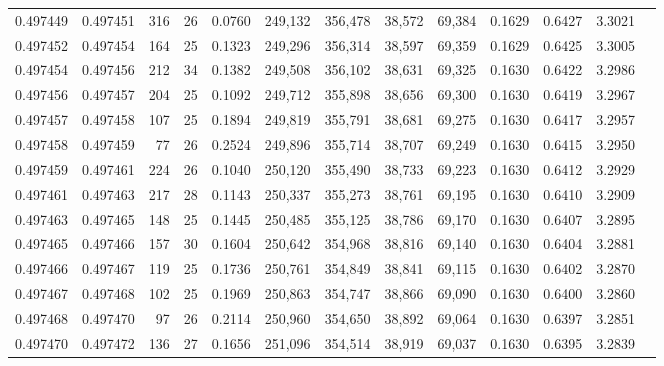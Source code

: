 \begin{tabular}{rrrrrrrrrrrrr}
0.497449 & 0.497451 & 316 &  26 &                                     0.0760 & 249,132 & 356,478 &  38,572 &  69,384 & 0.1629 & 0.6427 & 3.3021 \\
0.497452 & 0.497454 & 164 &  25 &                                     0.1323 & 249,296 & 356,314 &  38,597 &  69,359 & 0.1629 & 0.6425 & 3.3005 \\
0.497454 & 0.497456 & 212 &  34 &                                     0.1382 & 249,508 & 356,102 &  38,631 &  69,325 & 0.1630 & 0.6422 & 3.2986 \\
0.497456 & 0.497457 & 204 &  25 &                                     0.1092 & 249,712 & 355,898 &  38,656 &  69,300 & 0.1630 & 0.6419 & 3.2967 \\
0.497457 & 0.497458 & 107 &  25 &                                     0.1894 & 249,819 & 355,791 &  38,681 &  69,275 & 0.1630 & 0.6417 & 3.2957 \\
0.497458 & 0.497459 &  77 &  26 &                                     0.2524 & 249,896 & 355,714 &  38,707 &  69,249 & 0.1630 & 0.6415 & 3.2950 \\
0.497459 & 0.497461 & 224 &  26 &                                     0.1040 & 250,120 & 355,490 &  38,733 &  69,223 & 0.1630 & 0.6412 & 3.2929 \\
0.497461 & 0.497463 & 217 &  28 &                                     0.1143 & 250,337 & 355,273 &  38,761 &  69,195 & 0.1630 & 0.6410 & 3.2909 \\
0.497463 & 0.497465 & 148 &  25 &                                     0.1445 & 250,485 & 355,125 &  38,786 &  69,170 & 0.1630 & 0.6407 & 3.2895 \\
0.497465 & 0.497466 & 157 &  30 &                                     0.1604 & 250,642 & 354,968 &  38,816 &  69,140 & 0.1630 & 0.6404 & 3.2881 \\
0.497466 & 0.497467 & 119 &  25 &                                     0.1736 & 250,761 & 354,849 &  38,841 &  69,115 & 0.1630 & 0.6402 & 3.2870 \\
0.497467 & 0.497468 & 102 &  25 &                                     0.1969 & 250,863 & 354,747 &  38,866 &  69,090 & 0.1630 & 0.6400 & 3.2860 \\
0.497468 & 0.497470 &  97 &  26 &                                     0.2114 & 250,960 & 354,650 &  38,892 &  69,064 & 0.1630 & 0.6397 & 3.2851 \\
0.497470 & 0.497472 & 136 &  27 &                                     0.1656 & 251,096 & 354,514 &  38,919 &  69,037 & 0.1630 & 0.6395 & 3.2839 \\

\end{tabular}
